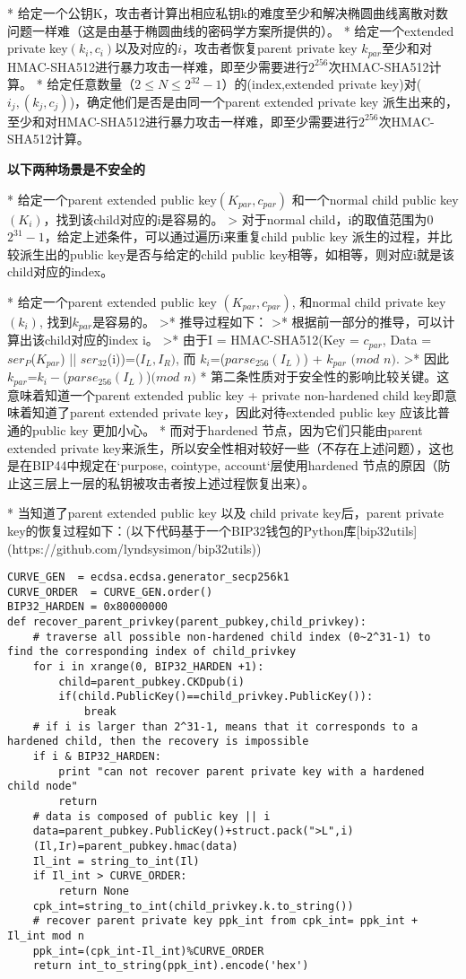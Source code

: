 \documentclass{article}
\begin{document}
* 给定一个公钥K，攻击者计算出相应私钥k的难度至少和解决椭圆曲线离散对数问题一样难（这是由基于椭圆曲线的密码学方案所提供的）。
* 给定一个extended private key$(k_i,c_i)$以及对应的$i$，攻击者恢复parent private key $k_{par}$至少和对HMAC-SHA512进行暴力攻击一样难，即至少需要进行$2^{256}$次HMAC-SHA512计算。
* 给定任意数量（$2\leq N\leq 2^{32}-1$）的(index,extended private key)对($i_j,(k_j,c_j)$)，确定他们是否是由同一个parent extended private key 派生出来的，至少和对HMAC-SHA512进行暴力攻击一样难，即至少需要进行$2^{256}$次HMAC-SHA512计算。

\textbf{以下两种场景是不安全的}

* 给定一个parent extended public key$(K_{par},c_{par})$ 和一个normal child public key $(K_i)$，找到该child对应的i是容易的。
> 对于normal child，i的取值范围为$0$~$2^{31}-1$，给定上述条件，可以通过遍历i来重复child public key 派生的过程，并比较派生出的public key是否与给定的child public key相等，如相等，则对应i就是该child对应的index。

* 给定一个parent extended public key $(K_{par},c_{par})$, 和normal child private key $(k_i)$, 找到$k_{par}$是容易的。
>* 推导过程如下：
>* 根据前一部分的推导，可以计算出该child对应的index i。  
>* 由于I = HMAC-SHA512(Key = $c_{par}$, Data = $ser_P$($K_{par}$) || $ser_{32}$(i))=($I_L,I_R)$, 而 $k_i$=($parse_{256}(I_L)$) + $k_{par}$ $(mod$ $n)$.   
>* 因此 $k_{par}$=$k_i-$($parse_{256}(I_L)$)$(mod$ $n)$    
* 第二条性质对于安全性的影响比较关键。这意味着知道一个parent extended public key + private non-hardened child key即意味着知道了parent extended private key，因此对待extended public key 应该比普通的public key 更加小心。
* 而对于hardened 节点，因为它们只能由parent extended private key来派生，所以安全性相对较好一些（不存在上述问题），这也是在BIP44中规定在`purpose, cointype, account`层使用hardened 节点的原因（防止这三层上一层的私钥被攻击者按上述过程恢复出来）。

* 当知道了parent extended public key 以及 child private key后，parent private key的恢复过程如下：(以下代码基于一个BIP32钱包的Python库[bip32utils](https://github.com/lyndsysimon/bip32utils))

\begin{lstlisting}
CURVE_GEN  = ecdsa.ecdsa.generator_secp256k1
CURVE_ORDER  = CURVE_GEN.order()
BIP32_HARDEN = 0x80000000 
def recover_parent_privkey(parent_pubkey,child_privkey):
	# traverse all possible non-hardened child index (0~2^31-1) to find the corresponding index of child_privkey
	for i in xrange(0, BIP32_HARDEN +1):
		child=parent_pubkey.CKDpub(i)
		if(child.PublicKey()==child_privkey.PublicKey()):
			break
    # if i is larger than 2^31-1, means that it corresponds to a hardened child, then the recovery is impossible
	if i & BIP32_HARDEN:
		print "can not recover parent private key with a hardened child node"
		return
	# data is composed of public key || i
	data=parent_pubkey.PublicKey()+struct.pack(">L",i)
	(Il,Ir)=parent_pubkey.hmac(data)
	Il_int = string_to_int(Il)
	if Il_int > CURVE_ORDER:
	    return None
	cpk_int=string_to_int(child_privkey.k.to_string())
	# recover parent private key ppk_int from cpk_int= ppk_int + Il_int mod n
	ppk_int=(cpk_int-Il_int)%CURVE_ORDER
	return int_to_string(ppk_int).encode('hex')
\end{lstlisting}
\end{document}
